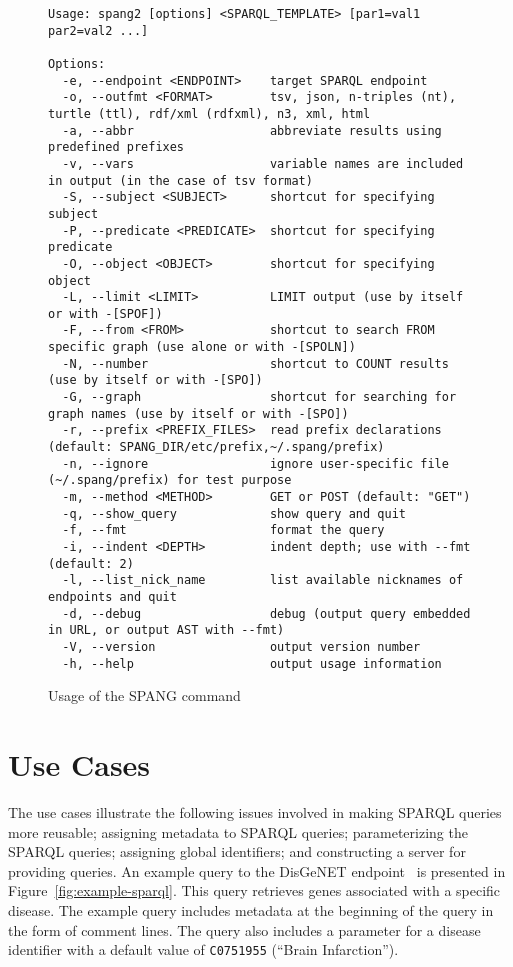 \documentclass[runningheads]{llncs}
\begin{document}
\begin{figure}[!t]
\begin{scriptsize}
\begin{verbatim}
Usage: spang2 [options] <SPARQL_TEMPLATE> [par1=val1 par2=val2 ...]

Options:
  -e, --endpoint <ENDPOINT>    target SPARQL endpoint
  -o, --outfmt <FORMAT>        tsv, json, n-triples (nt), turtle (ttl), rdf/xml (rdfxml), n3, xml, html
  -a, --abbr                   abbreviate results using predefined prefixes
  -v, --vars                   variable names are included in output (in the case of tsv format)
  -S, --subject <SUBJECT>      shortcut for specifying subject
  -P, --predicate <PREDICATE>  shortcut for specifying predicate
  -O, --object <OBJECT>        shortcut for specifying object
  -L, --limit <LIMIT>          LIMIT output (use by itself or with -[SPOF])
  -F, --from <FROM>            shortcut to search FROM specific graph (use alone or with -[SPOLN])
  -N, --number                 shortcut to COUNT results (use by itself or with -[SPO])
  -G, --graph                  shortcut for searching for graph names (use by itself or with -[SPO])
  -r, --prefix <PREFIX_FILES>  read prefix declarations (default: SPANG_DIR/etc/prefix,~/.spang/prefix)
  -n, --ignore                 ignore user-specific file (~/.spang/prefix) for test purpose
  -m, --method <METHOD>        GET or POST (default: "GET")
  -q, --show_query             show query and quit
  -f, --fmt                    format the query
  -i, --indent <DEPTH>         indent depth; use with --fmt (default: 2)
  -l, --list_nick_name         list available nicknames of endpoints and quit
  -d, --debug                  debug (output query embedded in URL, or output AST with --fmt)
  -V, --version                output version number
  -h, --help                   output usage information

\end{verbatim}
\end{scriptsize}
\caption{Usage of the SPANG command}
\label{fig:spang-command}
\end{figure}


\section{Use Cases}
The use cases illustrate the following issues involved in making SPARQL queries more reusable;
assigning metadata to SPARQL queries;
parameterizing the SPARQL queries;
assigning global identifiers;
and constructing a server for providing queries.
An example query to the DisGeNET endpoint~\cite{disgenet} is presented in Figure~\ref{fig:example-sparql}.
This query retrieves genes associated with a specific disease.
The example query includes metadata at the beginning of the query in the form of comment lines.
The query also includes a parameter for a disease identifier with a default value of \texttt{C0751955} (``Brain Infarction'').
\end{document}
